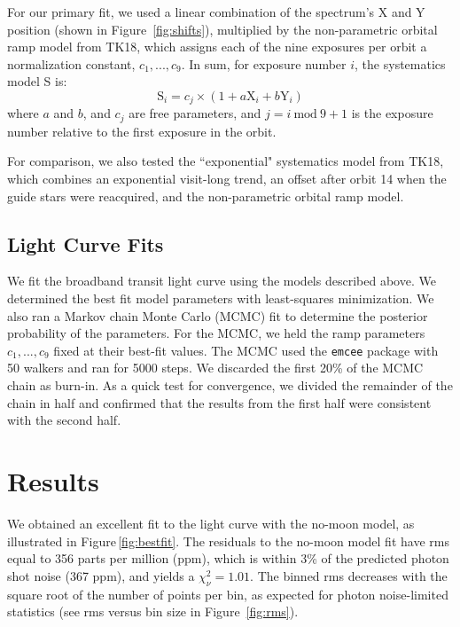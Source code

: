 \documentclass[twocolumn]{aastex62}
\newcommand{\Mod}[1]{\ \mathrm{mod}\ #1}
\begin{document}
For our primary fit, we used a linear combination of the spectrum's X and Y position (shown in Figure~\ref{fig:shifts}), multiplied by the non-parametric orbital ramp model from TK18, which assigns each of the nine exposures per orbit a normalization constant, $c_1, ..., c_9$. In sum, for exposure number $i$, the systematics model S is:
\begin{equation}
\label{eq:sys}
    \mathrm{S}_i = c_{j}\times(1 + a\mathrm{X}_i + b\mathrm{Y}_i) 
\end{equation}
where $a$ and $b$, and $c_j$ are free parameters, and $j = i\Mod9 + 1$ is the exposure number relative to the first exposure in the orbit. 

For comparison, we also tested the ``exponential" systematics model from TK18, which combines an exponential visit-long trend, an offset after orbit 14 when the guide stars were reacquired, and the non-parametric orbital ramp model.


\subsection{Light Curve Fits}
We fit the broadband transit light curve using the models described above.  We determined the best fit model parameters with least-squares minimization.  We also ran a Markov chain Monte Carlo (MCMC) fit to determine the posterior probability of the parameters. For the MCMC, we held the ramp parameters $c_1, ..., c_9$ fixed at their best-fit values.  The MCMC used the \texttt{emcee} package \citep{foremanmackey13} with 50 walkers and ran for 5000 steps. We discarded the first 20\% of the MCMC chain as burn-in. As a quick test for convergence, we divided the remainder of the chain in half and confirmed that the results from the first half were consistent with the second half.


\section{Results}
We obtained an excellent fit to the light curve with the no-moon model, as illustrated in  Figure\,\ref{fig:bestfit}. The residuals to the no-moon model fit have rms equal to 356 parts per million (ppm), which is within 3\% of the predicted photon shot noise (367 ppm), and yields a $\chi_\nu^2 = 1.01$. The binned rms decreases with the square root of the number of points per bin, as expected for photon noise-limited statistics (see rms versus bin size in Figure~\ref{fig:rms}).
\end{document}
